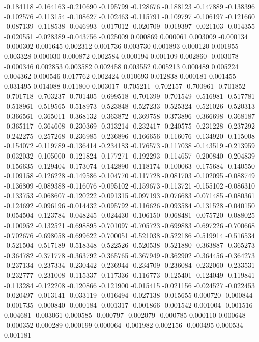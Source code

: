 -0.184118
-0.164163
-0.210690
-0.195799
-0.128676
-0.188123
-0.147889
-0.138396
-0.102576
-0.113154
-0.108627
-0.102463
-0.115791
-0.109797
-0.106197
-0.121660
-0.087139
-0.118538
-0.046993
-0.017012
-0.020709
-0.019397
-0.021103
-0.014355
-0.020551
-0.028389
-0.043756
-0.025009
0.000869
0.000061
0.003009
-0.000134
-0.000302
0.001645
0.002312
0.001736
0.003730
0.001893
0.000120
0.001955
0.003328
0.000030
0.000872
0.002584
0.000194
0.001109
0.002860
-0.003078
-0.000346
0.002853
0.003582
0.002458
0.003552
0.005213
0.000489
0.005224
0.004362
0.000546
0.017762
0.002424
0.010693
0.012838
0.000181
0.001455
0.031495
0.014088
0.011800
0.003017
-0.705211
-0.702157
-0.700961
-0.701852
-0.701718
-0.703237
-0.701405
-0.699518
-0.701399
-0.701549
-0.516981
-0.517781
-0.518961
-0.519565
-0.518973
-0.523848
-0.527233
-0.525324
-0.521026
-0.520313
-0.366561
-0.365011
-0.368132
-0.363872
-0.369758
-0.373896
-0.366698
-0.368187
-0.365117
-0.364608
-0.230369
-0.313214
-0.232417
-0.240575
-0.231228
-0.237292
-0.242275
-0.257268
-0.236985
-0.236896
-0.166656
-0.116076
-0.134920
-0.115008
-0.154072
-0.119789
-0.136414
-0.234183
-0.176573
-0.117038
-0.143519
-0.213959
-0.032032
-0.105000
-0.121824
-0.177271
-0.192293
-0.114657
-0.200840
-0.204839
-0.156635
-0.129404
-0.173074
-0.142890
-0.118174
-0.100063
-0.175684
-0.140550
-0.109158
-0.126228
-0.149586
-0.104770
-0.117728
-0.081703
-0.102095
-0.088749
-0.136809
-0.089388
-0.116076
-0.095102
-0.159673
-0.113721
-0.155102
-0.086310
-0.133753
-0.068607
-0.120222
-0.091315
-0.097193
-0.076683
-0.071485
-0.080361
-0.124692
-0.096196
-0.014432
-0.095792
-0.116626
-0.093584
-0.131528
-0.040150
-0.054504
-0.123784
-0.048245
-0.024430
-0.106150
-0.068481
-0.075720
-0.088025
-0.100952
-0.132521
-0.698895
-0.701097
-0.705723
-0.699883
-0.697226
-0.700668
-0.702676
-0.698058
-0.699622
-0.700051
-0.521038
-0.522186
-0.519914
-0.516534
-0.521504
-0.517189
-0.518348
-0.522526
-0.520538
-0.521880
-0.363887
-0.365273
-0.364782
-0.371778
-0.363792
-0.365765
-0.367949
-0.362902
-0.364456
-0.364273
-0.237134
-0.237334
-0.230442
-0.236944
-0.234709
-0.236084
-0.232060
-0.233531
-0.232777
-0.231008
-0.115337
-0.117336
-0.116773
-0.125401
-0.124049
-0.119841
-0.113284
-0.122208
-0.120866
-0.121900
-0.015415
-0.021156
-0.024527
-0.022453
-0.020497
-0.013141
-0.033119
-0.016494
-0.027138
-0.015655
0.000720
-0.000844
-0.001735
-0.000840
-0.000184
-0.001317
-0.001866
-0.001542
0.001004
-0.001516
0.004681
-0.003061
0.000585
-0.000797
-0.002079
-0.000785
0.000110
0.000648
-0.000352
0.000289
0.000199
0.000064
-0.001982
0.002156
-0.000495
0.000534
0.001181
